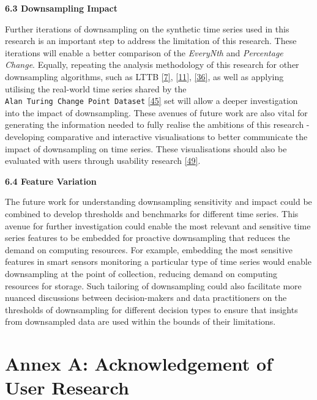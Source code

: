 \documentclass{article}
\begin{document}
\textbf{6.3 Downsampling Impact}

Further iterations of downsampling on the synthetic time series used in
this research is an important step to address the limitation of this
research. These iterations will enable a better comparison of the
\emph{EveryNth} and \emph{Percentage Change}. Equally, repeating the
analysis methodology of this research for other downsampling algorithms,
such as LTTB \protect\hyperlink{ref-MinMaxLTTB}{{[}7{]}},
\protect\hyperlink{ref-Sveinn}{{[}11{]}},
\protect\hyperlink{ref-MinMaxOrdered}{{[}36{]}}, as well as applying
utilising the real-world time series shared by the
\texttt{Alan\ Turing\ Change\ Point\ Dataset}
\protect\hyperlink{ref-ATIChangePoint}{{[}45{]}} set will allow a deeper
investigation into the impact of downsampling. These avenues of future
work are also vital for generating the information needed to fully
realise the ambitions of this research - developing comparative and
interactive visualisations to better communicate the impact of
downsampling on time series. These visualisations should also be
evaluated with users through usability research
\protect\hyperlink{ref-graphsampling}{{[}49{]}}.

\textbf{6.4 Feature Variation}

The future work for understanding downsampling sensitivity and impact
could be combined to develop thresholds and benchmarks for different
time series. This avenue for further investigation could enable the most
relevant and sensitive time series features to be embedded for proactive
downsampling that reduces the demand on computing resources. For
example, embedding the most sensitive features in smart sensors
monitoring a particular type of time series would enable downsampling at
the point of collection, reducing demand on computing resources for
storage. Such tailoring of downsampling could also facilitate more
nuanced discussions between decision-makers and data practitioners on
the thresholds of downsampling for different decision types to ensure
that insights from downsampled data are used within the bounds of their
limitations.

\newpage

\hypertarget{annex-a-acknowledgement-of-user-research}{%
\section{Annex A: Acknowledgement of User
Research}\label{annex-a-acknowledgement-of-user-research}}
\end{document}

